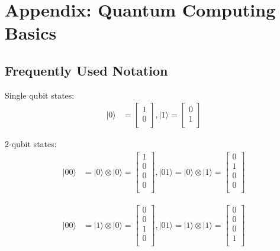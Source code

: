 \documentclass[twocolumn,showpacs,preprintnumbers,amsmath,amssymb]{revtex4}
\begin{document}
		\section{Appendix: Quantum Computing Basics}
		
		\subsection{Frequently Used Notation}
		Single qubit states: 
		\begin{align*}	
			|0\rangle &= \begin{bmatrix}
				1 \\
				0 \\
			\end{bmatrix}, 
		    |1\rangle = \begin{bmatrix}
				0 \\
				1 \\
			\end{bmatrix}
		\end{align*}
		
		2-qubit states: 
		\begin{align*}	
			|00\rangle &= |0\rangle \otimes |0\rangle = \begin{bmatrix}
				1 \\
				0 \\
				0 \\
				0 \\
			\end{bmatrix}, 
			|01\rangle = |0\rangle \otimes |1\rangle = \begin{bmatrix}
				0 \\
				1 \\
				0 \\
				0 \\
			\end{bmatrix} 			
		\end{align*}
		
		\begin{align*}	
			|00\rangle &= |1\rangle \otimes |0\rangle = \begin{bmatrix}
				0 \\
				0 \\
				1 \\
				0 \\
			\end{bmatrix}, 
			|01\rangle = |1\rangle \otimes |1\rangle = \begin{bmatrix}
				0 \\
				0 \\
				0 \\
				1 \\
			\end{bmatrix}		
		\end{align*}
		
\end{document}
